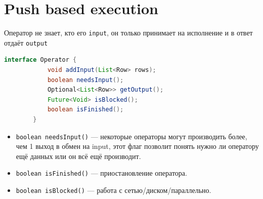 \documentclass[11pt]{article}
\begin{document}
    \newpage

    \section*{Push based execution}

    Оператор не знает, кто его \texttt{input}, он только принимает на исполнение и в ответ отдаёт \texttt{output}

    \begin{lstlisting}[language=Java]
        interface Operator {
            void addInput(List<Row> rows);
            boolean needsInput();
            Optional<List<Row>> getOutput();
            Future<Void> isBlocked();
            boolean isFinished();
        }
    \end{lstlisting}

    \begin{itemize}
        \item \texttt{boolean needsInput()} --- некоторые операторы могут производить более, чем 1 выход в обмен на input, этот флаг позволит понять нужно ли оператору ещё данных или он всё ещё производит.
        \item \texttt{boolean isFinished()} --- приостановление оператора.
        \item \texttt{boolean isBlocked()} --- работа с сетью/диском/параллельно.
    \end{itemize}
\end{document}
